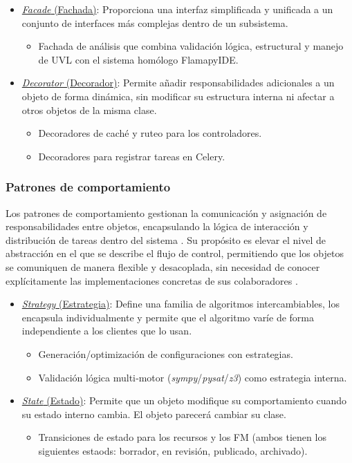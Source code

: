 \begin{itemize}
	\item \underline{\textit{Facade} (Fachada)}: Proporciona una interfaz simplificada y unificada a un conjunto de interfaces más complejas dentro de un subsistema.
	\begin{itemize}
		\item Fachada de análisis que combina validación lógica, estructural y manejo de \ac{UVL} con el sistema homólogo FlamapyIDE.
	\end{itemize} 
	\item \underline{\textit{Decorator} (Decorador)}: Permite añadir responsabilidades adicionales a un objeto de forma dinámica, sin modificar su estructura interna ni afectar a otros objetos de la misma clase.
	\begin{itemize}
		\item Decoradores de caché y ruteo para los controladores.
		\item Decoradores para registrar tareas en Celery.
	\end{itemize}
\end{itemize}
\subsubsection{Patrones de comportamiento}

Los patrones de comportamiento gestionan la comunicación y asignación de responsabilidades 
entre objetos, encapsulando la lógica de interacción y distribución de tareas dentro del sistema 
\citep{gamma1995design}. Su propósito es elevar el nivel de abstracción en el que se describe 
el flujo de control, permitiendo que los objetos se comuniquen de manera flexible y desacoplada, 
sin necesidad de conocer explícitamente las implementaciones concretas de sus colaboradores 
\citep{seguridad2022patrones}.

\begin{itemize}
	\item \underline{\textit{Strategy} (Estrategia)}: Define una familia de algoritmos intercambiables, los encapsula individualmente y permite que el algoritmo varíe de forma independiente a los clientes que lo usan.
	\begin{itemize}
		\item Generación/optimización de configuraciones con estrategias.
		\item Validación lógica multi‑motor (\textit{sympy}/\textit{pysat}/\textit{z3}) como estrategia interna.
	\end{itemize} 
	\item \underline{\textit{State} (Estado)}: Permite que un objeto modifique su comportamiento cuando su estado interno cambia. El objeto parecerá cambiar su clase.
	\begin{itemize}
		\item Transiciones de estado para los recursos y los \ac{FM} (ambos tienen los siguientes estaods: borrador, en revisión, publicado, archivado).
	\end{itemize} 
\end{itemize}

